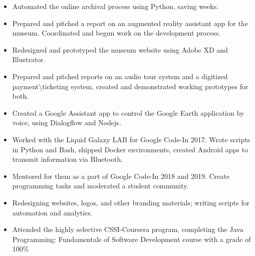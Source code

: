 \documentclass[a4paper]{resume}
\begin{document}
\begin{itemize} \vspace{-5pt} \itemsep -2pt
	\item Automated the online archival process using Python, saving weeks.
	\item Prepared and pitched a report on an augmented reality assistant app for the museum. Coordinated and begun work on the development process.
	\item Redesigned and prototyped the museum website using Adobe XD and Illustrator.
	\item Prepared and pitched reports on an audio tour system and a digitized payment\textbackslash ticketing system, created and demonstrated working prototypes for both.
\end{itemize}
\enresubsection
{}
\begin{itemize} \vspace{-5pt} \itemsep -2pt
	\item Created a Google Assistant app to control the Google Earth application by voice, using Dialogflow and Nodejs.	
	\item Worked with the Liquid Galaxy LAB for Google Code-In 2017. Wrote scripts in Python and Bash, shipped Docker environments, created Android apps to transmit information via Bluetooth.
	\item Mentored for them as a part of Google Code-In 2018 and 2019. Create programming tasks and moderated a student community.
\end{itemize}
\enresubsection
{}
\begin{itemize} \vspace{-5pt} \itemsep -2pt
	\item Redesigning websites, logos, and other branding materials; writing scripts for automation and analytics.
\end{itemize}
\enresubsection
{}
\begin{itemize} \vspace{-5pt} \itemsep -2pt
	\item Attended the highly selective CSSI-Coursera program, completing the Java Programming: Fundamentals of Software Development course with a grade of 100\%
\end{itemize}
\enresection
\end{document}
